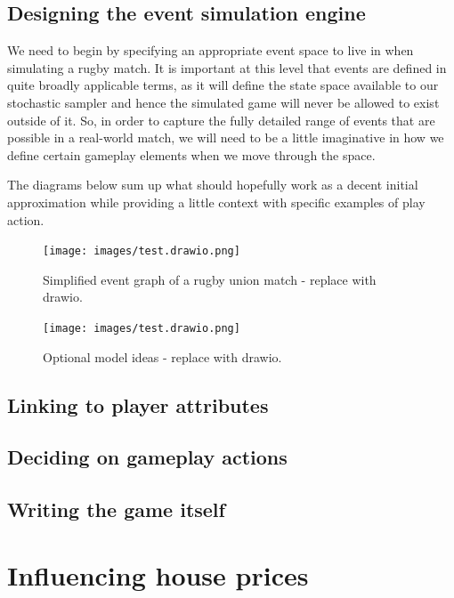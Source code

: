\documentclass{book}
\begin{document}
\section{\sffamily Designing the event simulation engine}

We need to begin by specifying an appropriate event space to live in when simulating a rugby match. It is important at this level that events are defined in quite broadly applicable terms, as it will define the state space available to our stochastic sampler and hence the simulated game will never be allowed to exist outside of it. So, in order to capture the fully detailed range of events that are possible in a real-world match, we will need to be a little imaginative in how we define certain gameplay elements when we move through the space.

The diagrams below sum up what should hopefully work as a decent initial approximation while providing a little context with specific examples of play action.

\begin{figure}[h]
\texttt{[image: images/test.drawio.png]}
\caption{Simplified event graph of a rugby union match - replace with drawio.}
\label{fig:event-graph}
\end{figure}

\begin{figure}[h]
\texttt{[image: images/test.drawio.png]}
\caption{Optional model ideas - replace with drawio.}
\label{fig:model-ideas}
\end{figure}

\section{\sffamily Linking to player attributes}

\section{\sffamily Deciding on gameplay actions}

\section{\sffamily Writing the game itself}

\chapter{\sffamily Influencing house prices}
\end{document}
